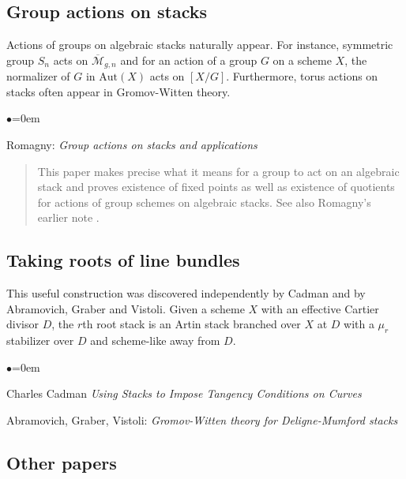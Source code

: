 \subsection{Group actions on stacks}
\label{subsection-group-actions}

\noindent
Actions of groups on algebraic stacks naturally appear.
For instance, symmetric group $S_n$ acts on $\overline{\mathcal{M}}_{g, n}$
and for an action of a group $G$ on a scheme $X$, the normalizer of $G$ in
$\text{Aut}(X)$ acts on $[X/G]$.  Furthermore, torus actions on stacks
often appear in Gromov-Witten theory.
\begin{list}{$\bullet$}{\leftmargin=0em}
\item Romagny:  \emph{Group actions on stacks and applications}
\cite{romagny_actions}
\begin{quote}
This paper makes precise what it means for a group to act on an algebraic
stack and proves existence of fixed points as well as existence of quotients
for actions of group schemes on algebraic stacks.  See also Romagny's earlier
note \cite{romagny_notes}.
\end{quote}
\smallskip
\end{list}

\subsection{Taking roots of line bundles}
\label{subsection-root-stacks}

\noindent
This useful construction was discovered independently by Cadman and by
Abramovich, Graber and Vistoli.  Given a scheme $X$ with an effective Cartier
divisor $D$, the $r$th root stack is an Artin stack branched over $X$ at $D$
with a $\mu_r$ stabilizer over $D$ and scheme-like away from $D$.

\begin{list}{$\bullet$}{\leftmargin=0em}
\item Charles Cadman
\emph{Using Stacks to Impose Tangency Conditions on Curves}
\cite{cadman}
\smallskip
\item Abramovich, Graber, Vistoli: \emph{Gromov-Witten theory for
Deligne-Mumford stacks} \cite{agv}
\end{list}

\subsection{Other papers}
\label{subsection-other}

